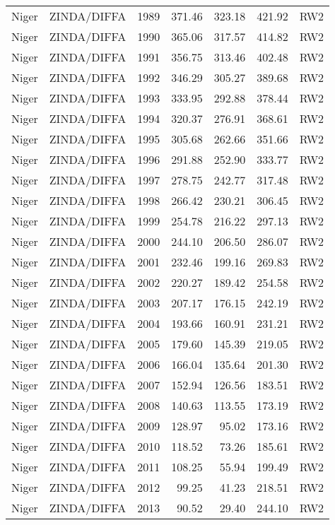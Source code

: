 \begin{longtable}{lllrrrl}
  Niger & ZINDA/DIFFA & 1989 & 371.46 & 323.18 & 421.92 & RW2 \\ 
  Niger & ZINDA/DIFFA & 1990 & 365.06 & 317.57 & 414.82 & RW2 \\ 
  Niger & ZINDA/DIFFA & 1991 & 356.75 & 313.46 & 402.48 & RW2 \\ 
  Niger & ZINDA/DIFFA & 1992 & 346.29 & 305.27 & 389.68 & RW2 \\ 
  Niger & ZINDA/DIFFA & 1993 & 333.95 & 292.88 & 378.44 & RW2 \\ 
  Niger & ZINDA/DIFFA & 1994 & 320.37 & 276.91 & 368.61 & RW2 \\ 
  Niger & ZINDA/DIFFA & 1995 & 305.68 & 262.66 & 351.66 & RW2 \\ 
  Niger & ZINDA/DIFFA & 1996 & 291.88 & 252.90 & 333.77 & RW2 \\ 
  Niger & ZINDA/DIFFA & 1997 & 278.75 & 242.77 & 317.48 & RW2 \\ 
  Niger & ZINDA/DIFFA & 1998 & 266.42 & 230.21 & 306.45 & RW2 \\ 
  Niger & ZINDA/DIFFA & 1999 & 254.78 & 216.22 & 297.13 & RW2 \\ 
  Niger & ZINDA/DIFFA & 2000 & 244.10 & 206.50 & 286.07 & RW2 \\ 
  Niger & ZINDA/DIFFA & 2001 & 232.46 & 199.16 & 269.83 & RW2 \\ 
  Niger & ZINDA/DIFFA & 2002 & 220.27 & 189.42 & 254.58 & RW2 \\ 
  Niger & ZINDA/DIFFA & 2003 & 207.17 & 176.15 & 242.19 & RW2 \\ 
  Niger & ZINDA/DIFFA & 2004 & 193.66 & 160.91 & 231.21 & RW2 \\ 
  Niger & ZINDA/DIFFA & 2005 & 179.60 & 145.39 & 219.05 & RW2 \\ 
  Niger & ZINDA/DIFFA & 2006 & 166.04 & 135.64 & 201.30 & RW2 \\ 
  Niger & ZINDA/DIFFA & 2007 & 152.94 & 126.56 & 183.51 & RW2 \\ 
  Niger & ZINDA/DIFFA & 2008 & 140.63 & 113.55 & 173.19 & RW2 \\ 
  Niger & ZINDA/DIFFA & 2009 & 128.97 & 95.02 & 173.16 & RW2 \\ 
  Niger & ZINDA/DIFFA & 2010 & 118.52 & 73.26 & 185.61 & RW2 \\ 
  Niger & ZINDA/DIFFA & 2011 & 108.25 & 55.94 & 199.49 & RW2 \\ 
  Niger & ZINDA/DIFFA & 2012 & 99.25 & 41.23 & 218.51 & RW2 \\ 
  Niger & ZINDA/DIFFA & 2013 & 90.52 & 29.40 & 244.10 & RW2 \\ 

\end{longtable}
